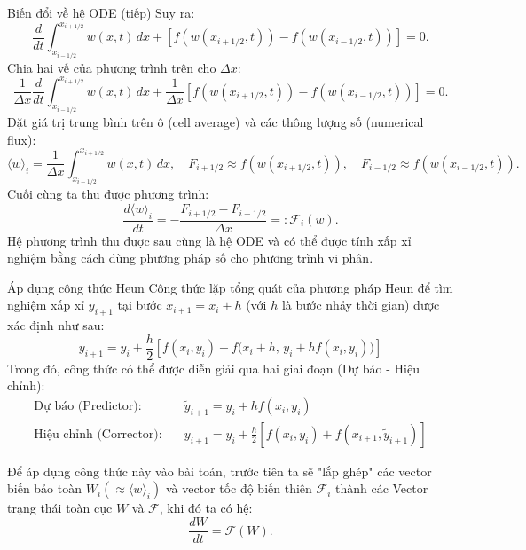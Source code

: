 \documentclass[aspectratio=43,10pt]{beamer}
\begin{document}
\begin{frame}{Biến đổi về hệ ODE (tiếp)}
Suy ra:
\[
\frac{d}{dt} \int_{x_{i-1/2}}^{x_{i+1/2}} w(x,t) \, dx + \left[ f(w(x_{i+1/2}, t)) - f(w(x_{i-1/2}, t)) \right] = 0.
\]
Chia hai vế của phương trình trên cho $\Delta x$:
\[
\frac{1}{\Delta x}\frac{d}{dt} \int_{x_{i-1/2}}^{x_{i+1/2}} w(x,t) \, dx + \frac{1}{\Delta x}\left[ f(w(x_{i+1/2}, t)) - f(w(x_{i-1/2}, t)) \right] = 0.
\]
Đặt giá trị trung bình trên ô (cell average) và các thông lượng số (numerical flux):
\[
\langle w \rangle_i = \frac{1}{\Delta x}\int_{x_{i-1/2}}^{x_{i+1/2}} w(x,t) \, dx, \quad F_{i+1/2} \approx f(w(x_{i+1/2}, t)), \quad F_{i-1/2} \approx f(w(x_{i-1/2}, t)).
\]
Cuối cùng ta thu được phương trình:
\[
\frac{d\langle w \rangle_i}{dt} = - \frac{F_{i+1/2} - F_{i-1/2}}{\Delta x} =: \mathcal{F}_i(w).
\]
Hệ phương trình thu được sau cùng là hệ ODE và có thể được tính xấp xỉ nghiệm bằng cách dùng phương pháp số cho phương trình vi phân.
\end{frame}

\begin{frame}{Áp dụng công thức Heun}
Công thức lặp tổng quát của phương pháp Heun để tìm nghiệm xấp xỉ $y_{i+1}$ tại bước $x_{i+1} = x_i + h$ (với $h$ là bước nhảy thời gian) được xác định như sau:
\begin{equation*}
    y_{i+1} = y_i + \frac{h}{2} \left[ f(x_i, y_i) + f\Big(x_i + h, \, y_i + h f(x_i, y_i)\Big)\right]
\end{equation*}
Trong đó, công thức có thể được diễn giải qua hai giai đoạn (Dự báo - Hiệu chỉnh):
\begin{align*}
    \text{Dự báo (Predictor):} & \quad \tilde{y}_{i+1} = y_i + h f(x_i, y_i) \\
    \text{Hiệu chỉnh (Corrector):} & \quad y_{i+1} = y_i + \frac{h}{2} \left[ f(x_i, y_i) + f(x_{i+1}, \tilde{y}_{i+1}) \right]
\end{align*}

\noindent Để áp dụng công thức này vào bài toán, trước tiên ta sẽ "lắp ghép" các vector biến bảo toàn $W_i (\approx \langle w \rangle_i)$ và vector tốc độ biến thiên $\mathcal{F}_i$ thành các Vector trạng thái toàn cục $W$ và $\mathcal{F}$, khi đó ta có hệ:
\[
\dfrac{dW}{dt} = \mathcal{F}(W).
\]
\end{frame}
\end{document}
